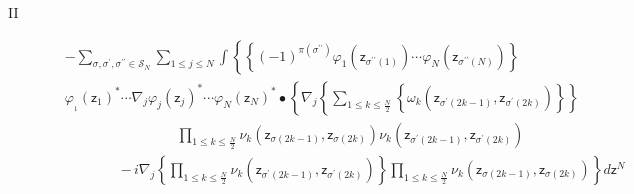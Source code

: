 \documentclass[aps,preprint]{revtex4}%
\begin{document}
\begin{description}
\item[II]
\begin{align}
&  -%
{\displaystyle\sum\limits_{\sigma,\sigma^{\prime},\sigma^{\prime\prime}%
\in\mathcal{S}_{N}}}
{\displaystyle\sum\limits_{1\leq j\leq N}}
\int\left\{  \left\{  \left(  -1\right)  ^{\pi\left(  \sigma^{\prime\prime
}\right)  }\varphi_{1}\left(  \mathsf{z}_{\sigma^{\prime\prime}\left(
1\right)  }\right)  \cdots\varphi_{N}\left(  \mathsf{z}_{\sigma^{\prime\prime
}\left(  N\right)  }\right)  \right\}  \right. \nonumber\\
&  \varphi_{_{1}}\left(  \mathsf{z}_{1}\right)  ^{\ast}\cdots\nabla_{j}%
\varphi_{j}\left(  \mathsf{z}_{j}\right)  ^{\ast}\cdots\varphi_{N}\left(
\mathsf{z}_{N}\right)  ^{\ast}\bullet\left\{  \nabla_{j}\left\{
{\displaystyle\sum\limits_{1\leq k\leq\frac{N}{2}}}
\left\{  \omega_{k}\left(  \mathsf{z}_{\sigma^{\prime}\left(  2k-1\right)
},\mathsf{z}_{\sigma^{\prime}\left(  2k\right)  }\right)  \right\}  \right\}
\right. \nonumber\\
&  \qquad\qquad\left.  \qquad\right.  \qquad%
{\displaystyle\prod\limits_{1\leq k\leq\frac{N}{2}}}
\nu_{k}\left(  \mathsf{z}_{\sigma\left(  2k-1\right)  },\mathsf{z}%
_{\sigma\left(  2k\right)  }\right)  \nu_{k}\left(  \mathsf{z}_{\sigma
^{\prime}\left(  2k-1\right)  },\mathsf{z}_{\sigma^{\prime}\left(  2k\right)
}\right) \nonumber\\
&  \qquad\qquad\left.  -\,i\nabla_{j}\left\{
{\displaystyle\prod\limits_{1\leq k\leq\frac{N}{2}}}
\nu_{k}\left(  \mathsf{z}_{\sigma^{\prime}\left(  2k-1\right)  }%
,\mathsf{z}_{\sigma^{\prime}\left(  2k\right)  }\right)  \right\}
{\displaystyle\prod\limits_{1\leq k\leq\frac{N}{2}}}
\nu_{k}\left(  \mathsf{z}_{\sigma\left(  2k-1\right)  },\mathsf{z}%
_{\sigma\left(  2k\right)  }\right)  \right\}  d\mathsf{z}^{N}%
\end{align}



\end{description}
\end{document}
